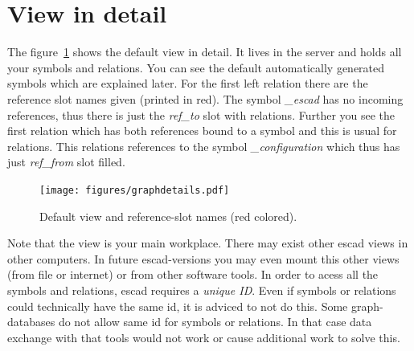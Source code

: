 \documentclass[a4paper, 12pt, openany]{scrbook}
\begin{document}
\section{View in detail}
The figure~\ref{fig:graphdetail} shows the default view in detail. It lives in the server and holds all your symbols and relations. You can see the default automatically generated symbols which are explained later. For the first left relation there are the reference slot names given (printed in red). The symbol \emph{\_escad} has no incoming references, thus there is just the \emph{ref\_to} slot with relations. Further you see the first relation which has both references bound to a symbol and this is usual for relations. This relations references to the symbol \emph{\_configuration} which thus has just \emph{ref\_from} slot filled.
\begin{figure}[htbp]
  \centering
  \texttt{[image: figures/graphdetails.pdf]}
  \caption{Default view and reference-slot names (red colored).}
  \label{fig:graphdetail}
\end{figure}
Note that the view is your main workplace. There may exist other escad views in other computers. In future escad-versions you may even mount this other views (from file or internet) or from other software tools. In order to acess all the symbols and relations, escad requires a \emph{unique ID}. Even if symbols or relations could technically have the same id, it is adviced to not do this. Some graph-databases do not allow same id for symbols or relations. In that case data exchange with that tools would not work or cause additional work to solve this.
\end{document}
